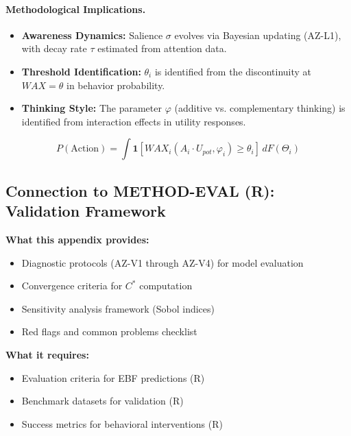 \paragraph{Methodological Implications.}

\begin{itemize}
\item \textbf{Awareness Dynamics:} Salience $\sigma$ evolves via Bayesian updating
(AZ-L1), with decay rate $\tau$ estimated from attention data.

\item \textbf{Threshold Identification:} $\theta_i$ is identified from the
discontinuity at $WAX = \theta$ in behavior probability.

\item \textbf{Thinking Style:} The parameter $\varphi$ (additive vs. complementary
thinking) is identified from interaction effects in utility responses.
\end{itemize}

\begin{equation}
\boxed{
P(\text{Action}) = \int \mathbf{1}[WAX_i(A_i \cdot U_{pot}, \varphi_i) \geq \theta_i] \, dF(\Theta_i)
}
\end{equation}

\subsection{Connection to METHOD-EVAL (R): Validation Framework}

\begin{tcolorbox}[colback=yellow!5!white, colframe=yellow!75!black,
    title=Integration: METHOD-CONSTRUCT $\leftrightarrow$ METHOD-EVAL (R)]
\textbf{What this appendix provides:}
\begin{itemize}[nosep]
\item Diagnostic protocols (AZ-V1 through AZ-V4) for model evaluation
\item Convergence criteria for $C^*$ computation
\item Sensitivity analysis framework (Sobol indices)
\item Red flags and common problems checklist
\end{itemize}

\textbf{What it requires:}
\begin{itemize}[nosep]
\item Evaluation criteria for EBF predictions (R)
\item Benchmark datasets for validation (R)
\item Success metrics for behavioral interventions (R)
\end{itemize}
\end{tcolorbox}

